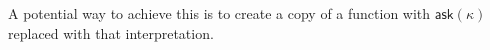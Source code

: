 \documentclass[a4paper, 11pt,titlepage, openright, twoside]{report}
\newcommand{\keyword}[1]{\textsf{\textup{#1}}}
\newcommand{\KwHandle}{\keyword{handle}}
\newcommand{\Handle}{\KwHandle\;}
\newcommand{\KwWith}{\keyword{with}}
\newcommand{\With}{\;\KwWith\;}
\newcommand{\Ask}{\textsf{ask}}
\newcommand{\Letrec}[3]{\keyword{letrec}\:#1\:\keyword{=}\:#2\:\keyword{in}\:#3}
\newcommand{\+}{\enspace}
\begin{document}
A potential way to achieve this is
to create a copy of a function with $\Ask(κ)$ replaced with that interpretation.



\printbibliography[heading=bibintoc]
\end{document}
